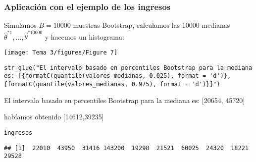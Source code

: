\subsubsection{Aplicación con el ejemplo de los ingresos}
Simulamos $B=10000$ muestras Bootstrap, calculamos las 10000 medianas $\hat{\theta}^{*1},\dots,\hat{\theta}^{*10000}$ y hacemos un histograma:
\begin{center}
    \texttt{[image: Tema 3/figures/Figure 7]}
\end{center}
\begin{tcolorbox}[colback=blue!5!white, colframe=blue!75!black, title=\textbf{Calculamos los percentiles 2.5\% y 97.5\%}]
\begin{lstlisting}
str_glue("El intervalo basado en percentiles Bootstrap para la mediana es: [{formatC(quantile(valores_medianas, 0.025), format = 'd')}, {formatC(quantile(valores_medianas, 0.975), format = 'd')}]")    
\end{lstlisting}
El intervalo basado en percentiles Bootstrap para la mediana es: [20654, 45720]
\end{tcolorbox}
\begin{tcolorbox}[colback=blue!5!white, colframe=blue!75!black, title=\textbf{Recordad que, con la aproximación $\hat{\theta}_n+1-96\cdot \hat{se}$,}]
    habíamos obtenido [14612,39235]
\end{tcolorbox}
\begin{lstlisting}
ingresos
\end{lstlisting}
\begin{verbatim}
## [1]  22010  43950  31416 143200  19298  21521  60025  24320  18221  29528
\end{verbatim}
\newpage

